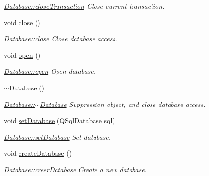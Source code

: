 \begin{DoxyCompactItemize}
\begin{DoxyCompactList}\small\item\em \hyperlink{classDatabase_a8322990bcba006d0d82ac069ad6e0307}{Database\-::close\-Transaction} Close current transaction. \end{DoxyCompactList}\item 
\hypertarget{classDatabase_ab89cb07242f0ab1d4058974bf3e7cf19}{void \hyperlink{classDatabase_ab89cb07242f0ab1d4058974bf3e7cf19}{close} ()}\label{classDatabase_ab89cb07242f0ab1d4058974bf3e7cf19}

\begin{DoxyCompactList}\small\item\em \hyperlink{classDatabase_ab89cb07242f0ab1d4058974bf3e7cf19}{Database\-::close} Close database access. \end{DoxyCompactList}\item 
\hypertarget{classDatabase_a0d0134e05c8f2dc4fcbbb2f36c02a779}{void \hyperlink{classDatabase_a0d0134e05c8f2dc4fcbbb2f36c02a779}{open} ()}\label{classDatabase_a0d0134e05c8f2dc4fcbbb2f36c02a779}

\begin{DoxyCompactList}\small\item\em \hyperlink{classDatabase_a0d0134e05c8f2dc4fcbbb2f36c02a779}{Database\-::open} Open database. \end{DoxyCompactList}\item 
\hypertarget{classDatabase_a84d399a2ad58d69daab9b05330e1316d}{\hyperlink{classDatabase_a84d399a2ad58d69daab9b05330e1316d}{$\sim$\-Database} ()}\label{classDatabase_a84d399a2ad58d69daab9b05330e1316d}

\begin{DoxyCompactList}\small\item\em \hyperlink{classDatabase_a84d399a2ad58d69daab9b05330e1316d}{Database\-::$\sim$\-Database} Suppression object, and close database access. \end{DoxyCompactList}\item 
void \hyperlink{classDatabase_a8b03d7f4a92325b9e519fd3f8a2e245c}{set\-Database} (Q\-Sql\-Database sql)
\begin{DoxyCompactList}\small\item\em \hyperlink{classDatabase_a8b03d7f4a92325b9e519fd3f8a2e245c}{Database\-::set\-Database} Set database. \end{DoxyCompactList}\item 
\hypertarget{classDatabase_a2dc260583a49889bed8097e21953594e}{void \hyperlink{classDatabase_a2dc260583a49889bed8097e21953594e}{create\-Database} ()}\label{classDatabase_a2dc260583a49889bed8097e21953594e}

\begin{DoxyCompactList}\small\item\em Database\-::creer\-Database Create a new database. \end{DoxyCompactList}\end{DoxyCompactItemize}
